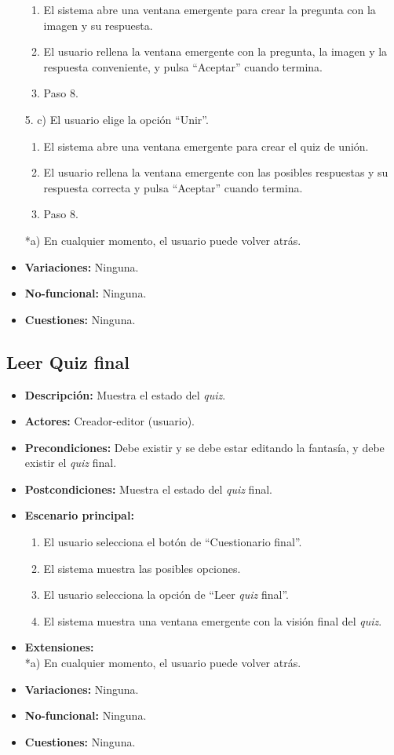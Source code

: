 \documentclass[12pt,letterpaper]{article}
\begin{document}
\begin{itemize}
\begin{enumerate}
		\item El sistema abre una ventana emergente para crear la pregunta con la imagen y su respuesta.
		\item El usuario rellena la ventana emergente con la pregunta, la imagen y la respuesta conveniente, y pulsa ``Aceptar'' cuando termina.
		\item Paso 8.
	\end{enumerate}
	5. c) El usuario elige la opción ``Unir''.
	\begin{enumerate}
		\item El sistema abre una ventana emergente para crear el quiz de unión.
		\item El usuario rellena la ventana emergente con las posibles respuestas y su respuesta correcta y pulsa ``Aceptar'' cuando termina.
		\item Paso 8.
	\end{enumerate}
	*a) En cualquier momento, el usuario puede volver atrás.
	\item \textbf{Variaciones:} Ninguna.
	\item \textbf{No-funcional:} Ninguna.
	\item \textbf{Cuestiones:} Ninguna.
\end{itemize}

\subsection{Leer Quiz final}
\begin{itemize}
	\item \textbf{Descripción:} Muestra el estado del \textit{quiz}.
	\item \textbf{Actores:} Creador-editor (usuario).
	\item \textbf{Precondiciones:} Debe existir y se debe estar editando la fantasía, y debe existir el \textit{quiz} final.
	\item \textbf{Postcondiciones:} Muestra el estado del \textit{quiz} final.
	\item \textbf{Escenario principal:}
	\begin{enumerate}
		\item El usuario selecciona el botón de ``Cuestionario final''.
		\item El sistema muestra las posibles opciones.
		\item El usuario selecciona la opción de ``Leer \textit{quiz} final''.
		\item El sistema muestra una ventana emergente con la visión final del \textit{quiz}.
	\end{enumerate}
	\item \textbf{Extensiones:} \\ *a) En cualquier momento, el usuario puede volver atrás.
	\item \textbf{Variaciones:} Ninguna.
	\item \textbf{No-funcional:} Ninguna.
	\item \textbf{Cuestiones:} Ninguna.
\end{itemize}
\end{document}
